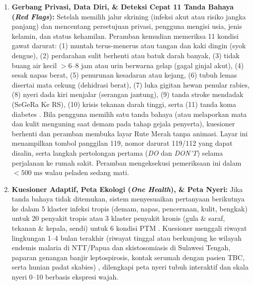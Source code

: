 \begin{enumerate}
    \item \textbf{Gerbang Privasi, Data Diri, \& Deteksi Cepat 11 Tanda Bahaya (\textit{Red Flags}):} 
    Setelah memilih jalur skrining (infeksi akut atau risiko jangka panjang) dan mencentang persetujuan privasi, pengguna mengisi usia, jenis kelamin, dan status kehamilan. Peramban kemudian memeriksa 11 kondisi gawat darurat: (1) muntah terus-menerus atau tangan dan kaki dingin (syok dengue), (2) perdarahan sulit berhenti atau batuk darah banyak, (3) tidak buang air kecil $>6\text{--}8$ jam atau urin berwarna gelap (gagal ginjal akut), (4) sesak napas berat, (5) penurunan kesadaran atau kejang, (6) tubuh lemas disertai mata cekung (dehidrasi berat), (7) luka gigitan hewan penular rabies, (8) nyeri dada kiri menjalar (serangan jantung), (9) tanda stroke mendadak (SeGeRa Ke RS), (10) krisis tekanan darah tinggi, serta (11) tanda koma diabetes \citep{Kemenkes2022a}. Bila pengguna memilih satu tanda bahaya (atau melaporkan mata dan kulit menguning saat demam pada tahap gejala penyerta), kuesioner berhenti dan peramban membuka layar Rute Merah tanpa animasi. Layar ini menampilkan tombol panggilan 119, nomor darurat 119/112 yang dapat disalin, serta langkah pertolongan pertama (\textit{DO} dan \textit{DON'T}) selama perjalanan ke rumah sakit. Peramban mengeksekusi pemeriksaan ini dalam $<500\text{ ms}$ walau peladen sedang mati.

    \item \textbf{Kuesioner Adaptif, Peta Ekologi (\textit{One Health}), \& Peta Nyeri:} 
    Jika tanda bahaya tidak ditemukan, sistem menyesuaikan pertanyaan berikutnya ke dalam 5 klaster infeksi tropis (demam, napas, pencernaan, kulit, bengkak) untuk 20 penyakit tropis atau 3 klaster penyakit kronis (gula \& saraf, tekanan \& kepala, sendi) untuk 6 kondisi PTM \citep{PERKENI2024}. Kuesioner menggali riwayat lingkungan 1--4 bulan terakhir (riwayat tinggal atau berkunjung ke wilayah endemis malaria di NTT/Papua dan skistosomiasis di Sulawesi Tengah, paparan genangan banjir leptospirosis, kontak serumah dengan pasien TBC, serta hunian padat skabies) \citep{Permenkes2026}, dilengkapi peta nyeri tubuh interaktif dan skala nyeri 0--10 berbasis ekspresi wajah.


\end{enumerate}
